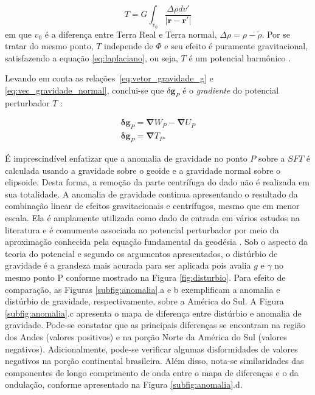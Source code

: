 \begin{equation} \label{eq:massas_anomalas}
\displaystyle { T = G \int_{v_0} \frac{\Delta \rho dv'}{| \mathbf{r} - \mathbf{r'} |} }
\end{equation} em que $v_{0}$ é a diferença entre Terra Real e Terra normal, $\Delta \rho = \rho - \tilde{\rho}$. Por se tratar do mesmo ponto, $T$ independe de $\Phi$ e seu efeito é puramente gravitacional, satisfazendo a equação \ref{eq:laplaciano}, ou seja, $T$ é um potencial harmônico \cite{lopes2006}.

Levando em conta as relações~\ref{eq:vetor_gravidade_g} e \ref{eq:vec_gravidade_normal}, conclui-se que $\delta \mathbf{g}_P$ é o \textit{gradiente} do potencial perturbador $T$  \cite{heiskanen1967,hofmann2006}:

\begin{equation} \label{eq:disturbio de gravidade=potencial anomalo}
\begin{gathered}
\displaystyle {\mathbf{\delta g}_{P} = \mathbf{\nabla} W_{P}-\mathbf{\nabla} U_{P}} \\
\displaystyle {\mathbf{\delta g}_{P} = \mathbf{\nabla} T_{P}}.
\end{gathered}
\end{equation} 

É imprescindível enfatizar que a anomalia de gravidade no ponto $P$ sobre a $SFT$ é calculada usando a gravidade sobre o geoide e a gravidade normal sobre o elipsoide. Desta forma, a remoção da parte centrífuga do dado não é realizada em sua totalidade. A anomalia de gravidade continua apresentando o resultado da combinação linear de efeitos gravitacionais e centrífugos, mesmo que em menor escala. Ela é amplamente utilizada como dado de entrada em vários estudos na literatura e é comumente associada ao potencial perturbador por meio da aproximação conhecida pela equação fundamental da geodésia \cite{arana2009}. Sob o aspecto da teoria do potencial e segundo os argumentos apresentados, o distúrbio de gravidade é a grandeza mais acurada para ser aplicada pois avalia $g$ e $\gamma$ no mesmo ponto P conforme mostrado na Figura \ref{fig:disturbio}. Para efeito de comparação, as Figuras \ref{subfig:anomalia}.a e b exemplificam a anomalia e distúrbio de gravidade, respectivamente, sobre a América do Sul. A Figura \ref{subfig:anomalia}.c apresenta o mapa de diferença entre distúrbio e anomalia de gravidade. Pode-se constatar que as principais diferenças se encontram na região dos Andes (valores positivos) e na porção Norte da América do Sul (valores negativos). Adicionalmente, pode-se verificar algumas disformidades de valores negativos na porção continental brasileira. Além disso, nota-se similaridades das componentes de longo comprimento de onda entre o mapa de diferenças e o da ondulação, conforme apresentado na Figura \ref{subfig:anomalia}.d.

